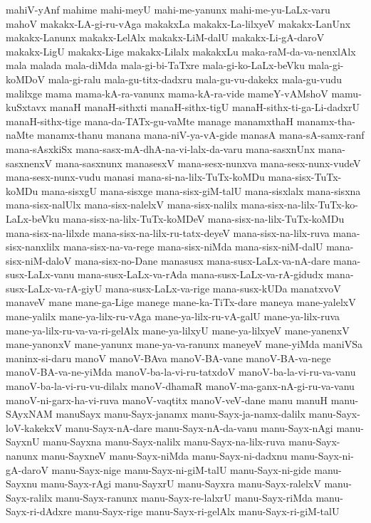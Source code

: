 {mahiV-yAnf
mahime
mahi-meyU
mahi-me-yanunx
mahi-me-yu-LaLx-varu
mahoV
makakx-LA-gi-ru-vAga
makakxLa
makakx-La-lilxyeV
makakx-LanUnx
makakx-Lanunx
makakx-LelAlx
makakx-LiM-dalU
makakx-Li-gA-daroV
makakx-LigU
makakx-Lige
makakx-Lilalx
makakxLu
maka-raM-da-va-nenxlAlx
mala
malada
mala-diMda
mala-gi-bi-TaTxre
mala-gi-ko-LaLx-beVku
mala-gi-koMDoV
mala-gi-ralu
mala-gu-titx-dadxru
mala-gu-vu-dakekx
mala-gu-vudu
malilxge
mama
mama-kA-ra-vanunx
mama-kA-ra-vide
mameY-vAMshoV
mamu-kuSxtavx
manaH
manaH-sithxti
manaH-sithx-tigU
manaH-sithx-ti-ga-Li-dadxrU
manaH-sithx-tige
mana-da-TATx-gu-vaMte
manage
manamxthaH
manamx-tha-naMte
manamx-thanu
manana
mana-niV-ya-vA-gide
manasA
mana-sA-samx-ranf
mana-sAsxkiSx
mana-sasx-mA-dhA-na-vi-lalx-da-varu
mana-sasxnUnx
mana-sasxnenxV
mana-sasxnunx
manasesxV
mana-sesx-nunxva
mana-sesx-nunx-vudeV
mana-sesx-nunx-vudu
manasi
mana-si-na-lilx-TuTx-koMDu
mana-sisx-TuTx-koMDu
mana-sisxgU
mana-sisxge
mana-sisx-giM-talU
mana-sisxlalx
mana-sisxna
mana-sisx-nalUlx
mana-sisx-nalelxV
mana-sisx-nalilx
mana-sisx-na-lilx-TuTx-ko-LaLx-beVku
mana-sisx-na-lilx-TuTx-koMDeV
mana-sisx-na-lilx-TuTx-koMDu
mana-sisx-na-lilxde
mana-sisx-na-lilx-ru-tatx-deyeV
mana-sisx-na-lilx-ruva
mana-sisx-nanxlilx
mana-sisx-na-va-rege
mana-sisx-niMda
mana-sisx-niM-dalU
mana-sisx-niM-daloV
mana-sisx-no-Dane
manasusx
mana-susx-LaLx-va-nA-dare
mana-susx-LaLx-vanu
mana-susx-LaLx-va-rAda
mana-susx-LaLx-va-rA-gidudx
mana-susx-LaLx-va-rA-giyU
mana-susx-LaLx-va-rige
mana-susx-kUDa
manatxvoV
manaveV
mane
mane-ga-Lige
manege
mane-ka-TiTx-dare
maneya
mane-yalelxV
mane-yalilx
mane-ya-lilx-ru-vAga
mane-ya-lilx-ru-vA-galU
mane-ya-lilx-ruva
mane-ya-lilx-ru-va-va-ri-gelAlx
mane-ya-lilxyU
mane-ya-lilxyeV
mane-yanenxV
mane-yanonxV
mane-yanunx
mane-ya-va-ranunx
maneyeV
mane-yiMda
maniVSa
maninx-si-daru
manoV
manoV-BAva
manoV-BA-vane
manoV-BA-va-nege
manoV-BA-va-ne-yiMda
manoV-ba-la-vi-ru-tatxdoV
manoV-ba-la-vi-ru-va-vanu
manoV-ba-la-vi-ru-vu-dilalx
manoV-dhamaR
manoV-ma-ganx-nA-gi-ru-va-vanu
manoV-ni-garx-ha-vi-ruva
manoV-vaqtitx
manoV-veV-dane
manu
manuH
manu-SAyxNAM
manuSayx
manu-Sayx-janamx
manu-Sayx-ja-namx-dalilx
manu-Sayx-loV-kakekxV
manu-Sayx-nA-dare
manu-Sayx-nA-da-vanu
manu-Sayx-nAgi
manu-SayxnU
manu-Sayxna
manu-Sayx-nalilx
manu-Sayx-na-lilx-ruva
manu-Sayx-nanunx
manu-SayxneV
manu-Sayx-niMda
manu-Sayx-ni-dadxnu
manu-Sayx-ni-gA-daroV
manu-Sayx-nige
manu-Sayx-ni-giM-talU
manu-Sayx-ni-gide
manu-Sayxnu
manu-Sayx-rAgi
manu-SayxrU
manu-Sayxra
manu-Sayx-ralelxV
manu-Sayx-ralilx
manu-Sayx-ranunx
manu-Sayx-re-lalxrU
manu-Sayx-riMda
manu-Sayx-ri-dAdxre
manu-Sayx-rige
manu-Sayx-ri-gelAlx
manu-Sayx-ri-giM-talU
}
